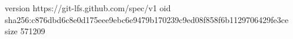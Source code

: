 version https://git-lfs.github.com/spec/v1
oid sha256:c876dbd6c8e0d175eee9ebc6e9479b170239c9ed08f858f6b1129706429fe3ce
size 571209
